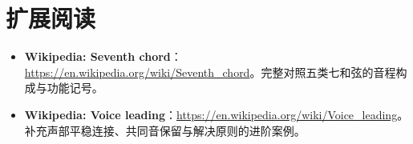 \section*{扩展阅读}
\begin{itemize}
  \item \textbf{Wikipedia: Seventh chord}：\url{https://en.wikipedia.org/wiki/Seventh_chord}。完整对照五类七和弦的音程构成与功能记号。
  \item \textbf{Wikipedia: Voice leading}：\url{https://en.wikipedia.org/wiki/Voice_leading}。补充声部平稳连接、共同音保留与解决原则的进阶案例。
\end{itemize}
